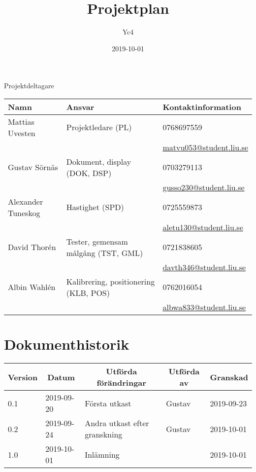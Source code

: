 \documentclass[10pt,swedish,oneside]{lips-no_customer}
\title{Projektplan}
\author{Yc4}
\date{2019-10-01}
\begin{document}
    \maketitle

    \cleardoublepage
    \makeprojectid

    \begin{center}
    \Large Projektdeltagare
    \end{center}
    \begin{center}
    \begin{tabular}{|l|l|l|}
    \hline
    \textbf{Namn} & \textbf{Ansvar} & \textbf{Kontaktinformation}\\
	\hline
	Mattias Uvesten & Projektledare (PL) & 0768697559\\
	&& \url{matvu053@student.liu.se} \\
    \hline
	Gustav Sörnäs & Dokument, display (DOK, DSP) & 0703279113\\
	&& \url{gusso230@student.liu.se} \\
    \hline
	Alexander Tuneskog & Hastighet (SPD) & 0725559873 \\
	&& \url{aletu130@student.liu.se} \\
    \hline
	David Thorén & Tester, gemensam målgång (TST, GML) & 0721838605 \\
	&& \url{davth346@student.liu.se} \\
    \hline
	Albin Wahlén & Kalibrering, positionering (KLB, POS) & 0762016054 \\
	&& \url{albwa833@student.liu.se} \\
    \hline
    \end{tabular}
    \end{center}

    \cleardoublepage
    \tableofcontents

    \cleardoublepage
	
	\section*{Dokumenthistorik}
		\begin{tabular}{p{}|p{}|p{}|p{}|p{}}
			\multicolumn{1}{c}{\bfseries Version} &
			\multicolumn{1}{|c}{\bfseries Datum} &
			\multicolumn{1}{|c}{\bfseries Utförda förändringar} &
			\multicolumn{1}{|c}{\bfseries Utförda av} &
			\multicolumn{1}{|c}{\bfseries Granskad}\\
			\hline
			\hline
			0.1 & 2019-09-20 & Första utkast & Gustav & 2019-09-23 \\\hline
			0.2 & 2019-09-24 & Andra utkast efter granskning & Gustav & 2019-10-01 \\\hline
			1.0 & 2019-10-01 & Inlämning & & 2019-10-01 \\\hline
		\end{tabular}
\end{document}

